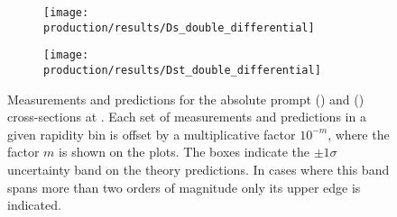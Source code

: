 \begin{figure}
  \begin{subfigure}[b]{\textwidth}
    \centering
    \texttt{[image: production/results/Ds\_double\_differential]}
    \caption{\PDsplus}
    \label{fig:prod:results:double_differential:Ds}
  \end{subfigure}
  \begin{subfigure}[b]{\textwidth}
    \centering
    \texttt{[image: production/results/Dst\_double\_differential]}
    \caption{\PDstarp}
    \label{fig:prod:results:double_differential:Dst}
  \end{subfigure}
  \caption{%
    Measurements and predictions for the absolute prompt \PDsplus 
    () and \PDstarp 
    () cross-sections at 
    .
    Each set of measurements and predictions in a given rapidity bin is offset 
    by a multiplicative factor $10^{-m}$, where the factor $m$ is shown on the 
    plots.
    The boxes indicate the $\pm1\sigma$ uncertainty band on the theory 
    predictions.
    In cases where this band spans more than two orders of magnitude only its 
    upper edge is indicated.
  }
  \label{fig:prod:results:double_differential:Ds_Dst}
\end{figure}

